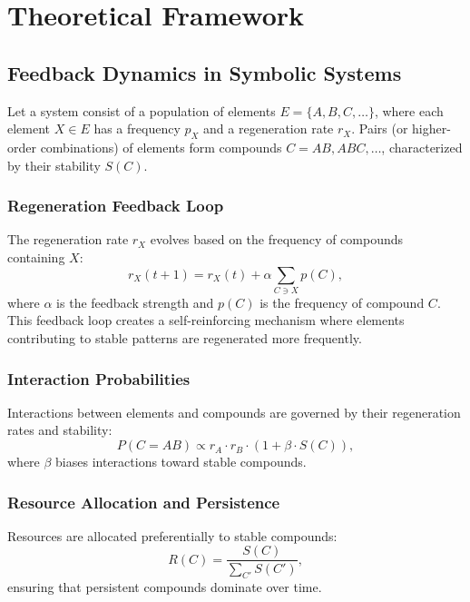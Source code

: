 \documentclass[entropy,article,submit,pdftex,moreauthors]{Definitions/mdpi}
\begin{document}
\section{Theoretical Framework}

\subsection{Feedback Dynamics in Symbolic Systems}

Let a system consist of a population of elements \( E = \{A, B, C, \ldots\} \), where each element \( X \in E \) has a frequency \( p_X \) and a regeneration rate \( r_X \). Pairs (or higher-order combinations) of elements form compounds \( C = AB, ABC, \ldots \), characterized by their stability \( S(C) \).

\subsubsection{Regeneration Feedback Loop}

The regeneration rate \( r_X \) evolves based on the frequency of compounds containing \( X \):
\begin{equation}
r_X(t+1) = r_X(t) + \alpha \sum_{C \ni X} p(C),
\end{equation}
where \( \alpha \) is the feedback strength and \( p(C) \) is the frequency of compound \( C \). This feedback loop creates a self-reinforcing mechanism where elements contributing to stable patterns are regenerated more frequently.

\subsubsection{Interaction Probabilities}

Interactions between elements and compounds are governed by their regeneration rates and stability:
\begin{equation}
P(C = AB) \propto r_A \cdot r_B \cdot (1 + \beta \cdot S(C)),
\end{equation}
where \( \beta \) biases interactions toward stable compounds.

\subsubsection{Resource Allocation and Persistence}

Resources are allocated preferentially to stable compounds:
\begin{equation}
R(C) = \frac{S(C)}{\sum_{C'} S(C')},
\end{equation}
ensuring that persistent compounds dominate over time.
\end{document}
